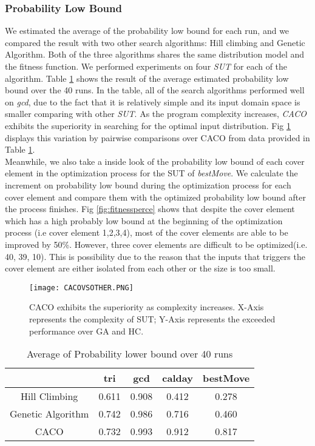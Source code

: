 \documentclass[journal]{IEEEtran}
\begin{document}
\subsubsection{Probability Low Bound}
We estimated the average of the probability low bound for each run, and we compared the result with two other search algorithms: Hill climbing and Genetic Algorithm. Both of the three algorithms shares the same distribution model and the fitness function. We performed experiments on four \emph{SUT} for each of the algorithm. Table \ref{table:2} shows the result of the average estimated probability low bound over the 40 runs. In the table, all of the search algorithms performed well on \emph{gcd}, due to the fact that it is relatively simple and its input domain space is smaller comparing with other \emph{SUT}. As the program complexity increases, \emph{CACO} exhibits the superiority in searching for the optimal input distribution. Fig \ref{fig:cacovs} displays this variation by pairwise comparisons over CACO from data provided in Table \ref{table:2}.\\
Meanwhile, we also take a inside look of the probability low bound of each cover element in the optimization process for the SUT of \emph{bestMove}. We calculate the increment on probability low bound during the optimization process for each cover element and compare them with the optimized probability low bound after the process finishes. Fig \ref{fig:fitnessperce} shows that despite the cover element which has a high probably low bound at the beginning of the optimization process (i.e cover element 1,2,3,4), most of the cover elements are able to be improved by 50\%. However, three cover elements are difficult to be optimized(i.e. 40, 39, 10). This is possibility due to the reason that the inputs that triggers the cover element are either isolated from each other or the size is too small.

 \begin{figure}[t]
	\hspace*{0.2cm}
	\texttt{[image: CACOVSOTHER.PNG]}
	\caption{CACO exhibits the superiority as complexity increases. X-Axis represents the complexity of SUT; Y-Axis represents the exceeded performance over GA and HC.}
	\label{fig:cacovs}
\end{figure} 

\begin{table}[t]
	\begin{center}
		\begin{tabular}{ |c|c|c|c|c|} 
			\hline
			\textbf{} & \textbf{tri} & \textbf{gcd} & \textbf{calday} & \textbf{bestMove}\\
			\hline
			Hill Climbing & 0.611 & 0.908 & 0.412 & 0.278\\ 
			Genetic Algorithm & 0.742  & 0.986 & 0.716 & 0.460\\ 
			CACO & 0.732 & 0.993 & 0.912 & 0.817\\
			\hline
		\end{tabular}

		\caption{Average of Probability lower bound over
			 40 runs}
		 		\label{table:2}
	\end{center}
\end{table}
\end{document}
